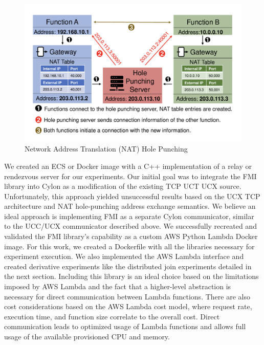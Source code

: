 \begin{figure}[ht]
    \begin{center}
    \includegraphics[width=\linewidth]{source/Figure/NatHolePunching.png}
    \end{center}
    \caption{Network Address Translation (NAT) Hole Punching\cite{copik2023fmi}}
    \label{fig:natholepunching}
\end{figure}

We created an ECS or Docker image with a C++ implementation of a relay or rendezvous server for our experiments.  Our initial goal was to integrate the FMI library into Cylon as a modification of the existing TCP UCT UCX source.  Unfortunately, this approach yielded unsuccessful results based on the UCX TCP architecture and NAT hole-punching address exchange semantics.  We believe an ideal approach is implementing FMI as a separate Cylon communicator, similar to the UCC/UCX communicator described above.  We successfully recreated and validated the FMI library's capability as a custom AWS Python Lambda Docker image.   For this work, we created a Dockerfile with all the libraries necessary for experiment execution.  We also implemented the AWS Lambda interface and created derivative experiments like the distributed join experiments detailed in the next section.  Including this library is an ideal choice based on the limitations imposed by AWS Lambda and the fact that a higher-level abstraction is necessary for direct communication between Lambda functions.  There are also cost considerations based on the AWS Lambda cost model, where request rate, execution time, and function size correlate to the overall cost.  Direct communication leads to optimized usage of Lambda functions and allows full usage of the available provisioned CPU and memory.

